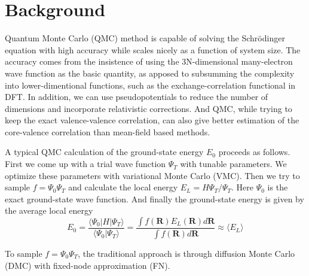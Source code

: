 \documentclass[aps,prl,reprint,groupedaddress]{revtex4-1}
\begin{document}
\section{\label{sec:background}Background}
Quantum Monte Carlo (QMC) method is capable of solving the Schrödinger equation with high accuracy while scales nicely as a function of system size.
The accuracy comes from the insistence of using the 3N-dimensional many-electron wave function as the basic quantity, as apposed to subsumming the complexity into lower-dimentional functions, such as the exchange-correlation functional in DFT.
In addition, we can use pseudopotentials to reduce the number of dimensions and incorporate relativistic corrections.
And QMC, while trying to keep the exact valence-valence correlation, can also give better estimation of the core-valence correlation than mean-field based methods.

A typical QMC calculation of the ground-state energy $E_0$ proceeds as follows. First we come up with a trial wave function $\Psi_T$ with tunable parameters.
We optimize these parameters with variational Monte Carlo (VMC).
Then we try to sample $f = \Psi_0\Psi_T$ and calculate the local energy $E_L = H\Psi_T/\Psi_T$.
Here $\Psi_0$ is the exact ground-state wave function.
And finally the ground-state energy is given by the average local energy
\begin{equation}
E_0 = \frac{\langle \Psi_0|H|\Psi_T \rangle}{\langle \Psi_0|\Psi_T \rangle}
= \frac{\int f(\mathbf{R})E_L(\mathbf{R})d\mathbf{R}}{\int f(\mathbf{R})d\mathbf{R}} \approx \langle E_L \rangle
\end{equation}

To sample $f = \Psi_0\Psi_T$, the traditional approach is through diffusion Monte Carlo (DMC) with fixed-node approximation (FN).
\end{document}
